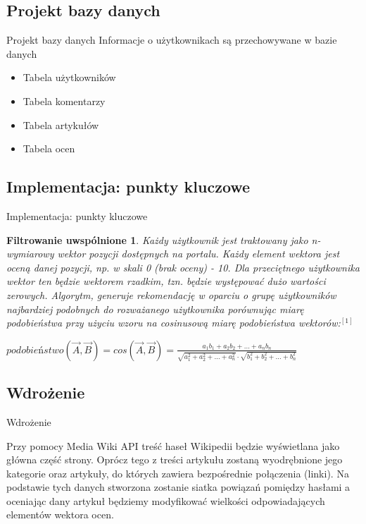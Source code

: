 \documentclass{beamer}
\begin{document}
\subsection{Projekt bazy danych}
\begin{frame}{Projekt bazy danych}
Informacje o użytkownikach są przechowywane w bazie danych
\begin{itemize}
\item{Tabela użytkowników}
\item{Tabela komentarzy}
\item{Tabela artykułów}
\item{Tabela ocen}
\end{itemize}
\end{frame}


\subsection{Implementacja: punkty kluczowe}
\begin{frame}{Implementacja: punkty kluczowe} 
\newtheorem{mydef4}{Filtrowanie uwspólnione}
\begin{mydef4}

Każdy użytkownik jest traktowany jako n-wymiarowy wektor pozycji dostępnych na portalu. Każdy element wektora jest oceną danej pozycji, np. w skali 0 (brak oceny) - 10. Dla przeciętnego użytkownika wektor ten będzie wektorem rzadkim, tzn. będzie występować dużo wartości zerowych. Algorytm, generuje rekomendację w oparciu o grupę użytkowników najbardziej podobnych do rozważanego użytkownika porównując miarę podobieństwa przy użyciu wzoru na cosinusową miarę podobieństwa wektorów:$ ^{[1]} $ \\ 

\begin{center}
$ podobieństwo(\overrightarrow{A},\overrightarrow{B}) = cos(\overrightarrow{A},\overrightarrow{B}) =  \frac{a_1 b_1 + a_2 b_2 + \ldots + a_n b_n }{ \sqrt{a_1^2 + a_2^2 + \ldots + a_n^2 }  \cdot \sqrt{b_1^2 + b_2^2 + \ldots + b_n^2 }} $
\end{center}
\end{mydef4}
\end{frame}


\subsection{Wdrożenie}
\begin{frame}{Wdrożenie} 

Przy pomocy Media Wiki API treść haseł Wikipedii będzie wyświetlana jako główna część strony.
Oprócz tego z treści artykułu zostaną wyodrębnione jego kategorie oraz artykuły, do których zawiera bezpośrednie połączenia (linki). Na podstawie tych danych stworzona zostanie siatka powiązań pomiędzy hasłami a oceniając dany artykuł będziemy modyfikować wielkości odpowiadających elementów wektora ocen.

\end{frame}
\end{document}
